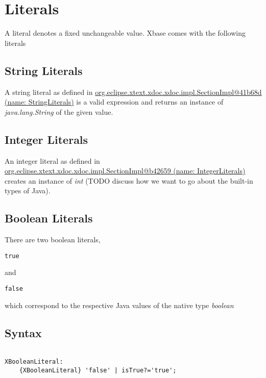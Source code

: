 \documentclass[a4paper,10pt]{scrreprt}
\begin{document}
\section{Literals}
\label{Literals}

A literal denotes a fixed unchangeable value. Xbase comes with the following literals

\subsection{ String Literals }
\label{ExpressionsStringLiterals}

A string literal as defined in 
\hyperref[StringLiterals]{org.eclipse.xtext.xdoc.xdoc.impl.SectionImpl@41b68d (name: StringLiterals)} is a valid expression and returns an instance of \emph{java.lang.String} of the given value.




\subsection{ Integer Literals }
\label{ExpressionsIntegerLiterals}

An integer literal as defined in 
\hyperref[IntegerLiterals]{org.eclipse.xtext.xdoc.xdoc.impl.SectionImpl@b42659 (name: IntegerLiterals)} creates an instance of \emph{int} (TODO discuss how we want to go about the built-in types of Java).




\subsection{ Boolean Literals }
\label{BooleanLiteral}

There are two boolean literals, 
\begin{lstlisting}
true
\end{lstlisting}
 and 
\begin{lstlisting}
false
\end{lstlisting}
 which correspond to the respective Java values of the native type \emph{boolean} 




\subsection{ Syntax }


\begin{lstlisting}

XBooleanLiteral:
	{XBooleanLiteral} 'false' | isTrue?='true';

\end{lstlisting}
\end{document}

